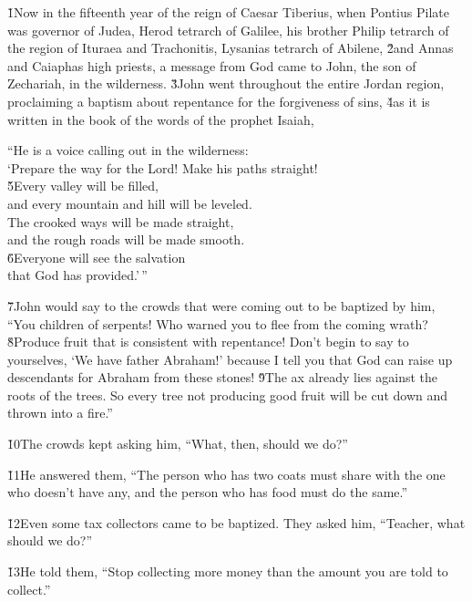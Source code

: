 \v{1}Now in the fifteenth year of the reign of Caesar Tiberius, when Pontius Pilate was governor of Judea, Herod tetrarch of Galilee, his brother Philip tetrarch of the region of Ituraea and Trachonitis, Lysanias tetrarch of Abilene, \v{2}and Annas and Caiaphas high priests, a message from God came to John, the son of Zechariah, in the wilderness. \v{3}John went throughout the entire Jordan region, proclaiming a baptism about repentance for the forgiveness of sins, \v{4}as it is written in the book of the words of the prophet Isaiah,

\begin{poetry}
\poeml ``He is a voice calling out in the wilderness: \\
\poemll    `Prepare the way for the Lord! Make his paths straight! \\
\poeml \v{5}Every valley will be filled, \\
\poemll    and every mountain and hill will be leveled. \\
\poeml The crooked ways will be made straight, \\
\poemll    and the rough roads will be made smooth. \\
\poeml \v{6}Everyone will see the salvation \\
\poemll    that God has provided.'\,''
\end{poetry}

\v{7}John would say to the crowds that were coming out to be baptized by him, ``You children of serpents! Who warned you to flee from the coming wrath? \v{8}Produce fruit that is consistent with repentance! Don't begin to say to yourselves, `We have father Abraham!' because I tell you that God can raise up descendants for Abraham from these stones! \v{9}The ax already lies against the roots of the trees. So every tree not producing good fruit will be cut down and thrown into a fire.''

\v{10}The crowds kept asking him, ``What, then, should we do?''

\v{11}He answered them, ``The person who has two coats must share with the one who doesn't have any, and the person who has food must do the same.''

\v{12}Even some tax collectors came to be baptized. They asked him, ``Teacher, what should we do?''

\v{13}He told them, ``Stop collecting more money than the amount you are told to collect.''

